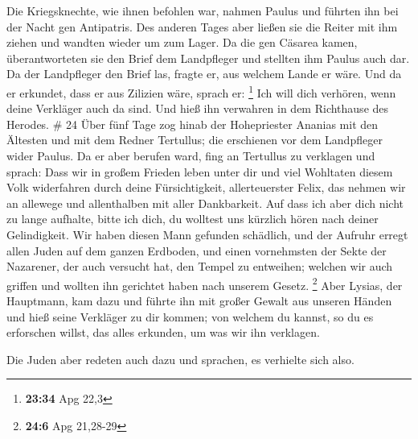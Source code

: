  Die Kriegsknechte, wie ihnen befohlen war, nahmen Paulus
und führten ihn bei der Nacht gen Antipatris.  Des
anderen Tages aber ließen sie die Reiter mit ihm ziehen und wandten
wieder um zum Lager.  Da die gen Cäsarea kamen,
überantworteten sie den Brief dem Landpfleger und stellten ihm Paulus
auch dar.  Da der Landpfleger den Brief las, fragte er,
aus welchem Lande er wäre. Und da er erkundet, dass er aus Zilizien
wäre, sprach er: \footnote{\textbf{23:34} Apg 22,3}  Ich
will dich verhören, wenn deine Verkläger auch da sind. Und hieß ihn
verwahren in dem Richthause des Herodes. \# 24  Über fünf
Tage zog hinab der Hohepriester Ananias mit den Ältesten und mit dem
Redner Tertullus; die erschienen vor dem Landpfleger wider Paulus.
 Da er aber berufen ward, fing an Tertullus zu verklagen
und sprach:  Dass wir in großem Frieden leben unter dir
und viel Wohltaten diesem Volk widerfahren durch deine Fürsichtigkeit,
allerteuerster Felix, das nehmen wir an allewege und allenthalben mit
aller Dankbarkeit.  Auf dass ich aber dich nicht zu lange
aufhalte, bitte ich dich, du wolltest uns kürzlich hören nach deiner
Gelindigkeit.  Wir haben diesen Mann gefunden schädlich,
und der Aufruhr erregt allen Juden auf dem ganzen Erdboden, und einen
vornehmsten der Sekte der Nazarener,  der auch versucht
hat, den Tempel zu entweihen; welchen wir auch griffen und wollten ihn
gerichtet haben nach unserem Gesetz. \footnote{\textbf{24:6} Apg
  21,28-29}  Aber Lysias, der Hauptmann, kam dazu und
führte ihn mit großer Gewalt aus unseren Händen  und hieß
seine Verkläger zu dir kommen; von welchem du kannst, so du es
erforschen willst, das alles erkunden, um was wir ihn verklagen.

 Die Juden aber redeten auch dazu und sprachen, es
verhielte sich also.

